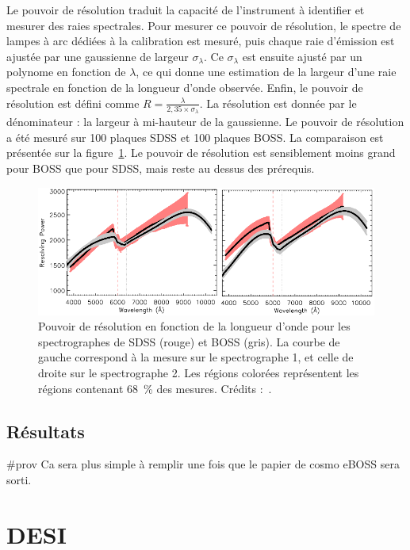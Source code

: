 Le pouvoir de résolution traduit la capacité de l'instrument à identifier et mesurer des raies spectrales. Pour mesurer ce pouvoir de résolution, le spectre de lampes à arc dédiées à la calibration est mesuré, puis chaque raie d'émission est ajustée par une gaussienne de largeur $\sigma_\lambda$. Ce $\sigma_\lambda$ est ensuite ajusté par un polynome en fonction de $\lambda$, ce qui donne une estimation de la largeur d'une raie spectrale en fonction de la longueur d'onde observée. Enfin, le pouvoir de résolution est défini comme $R = \frac{\lambda}{2,35 \times \sigma_\lambda}$. La résolution est donnée par le dénominateur : la largeur à mi-hauteur de la gaussienne. Le pouvoir de résolution a été mesuré sur \num{100} plaques SDSS et \num{100} plaques BOSS. La comparaison est présentée sur la figure~\ref{fig:SpectroResoPower}. Le pouvoir de résolution est sensiblement moins grand pour BOSS que pour SDSS, mais reste au dessus des prérequis.
\begin{figure}
  \centering
  \includegraphics[scale=0.5]{SpectroResoPower}
  \caption{Pouvoir de résolution en fonction de la longueur d'onde pour les spectrographes de SDSS (rouge) et BOSS (gris). La courbe de gauche correspond à la mesure sur le spectrographe 1, et celle de droite sur le spectrographe 2. Les régions colorées représentent les régions contenant \SI{68}{\percent} des mesures. Crédits :~\cite{Smee2012}.}
  \label{fig:SpectroResoPower}
\end{figure}


\subsection{Résultats}

\#prov Ca sera plus simple à remplir une fois que le papier de cosmo eBOSS sera sorti.

\section{DESI}

